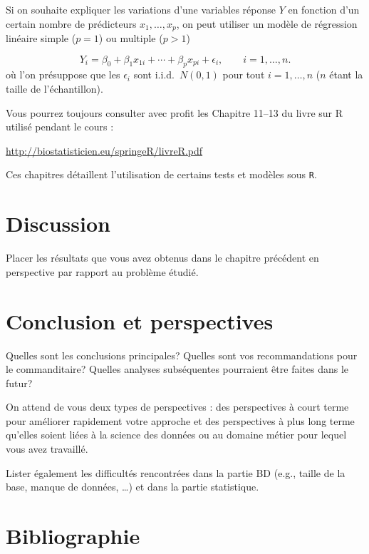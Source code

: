 \documentclass[mstat,12pt]{unswthesis}
\begin{document}
Si on souhaite expliquer les variations d'une variables réponse \(Y\) en
fonction d'un certain nombre de prédicteurs \(x_1,\ldots,x_p\), on peut
utiliser un modèle de régression linéaire simple (\(p=1\)) ou multiple
(\(p>1\))

\[
Y_i = \beta_0 + \beta_1 x_{1i} + \cdots +\beta_p x_{pi} + \epsilon_i, \qquad i=1,\ldots,n.
\] où l'on présuppose que les \(\epsilon_i\) sont i.i.d.~\(N(0,1)\) pour
tout \(i=1,\ldots,n\) (\(n\) étant la taille de l'échantillon).

Vous pourrez toujours consulter avec profit les Chapitre 11--13 du livre
sur R utilisé pendant le cours :

\url{http://biostatisticien.eu/springeR/livreR.pdf}

Ces chapitres détaillent l'utilisation de certains tests et modèles sous
\texttt{R}.

\chapter{Discussion}\label{discussion}

Placer les résultats que vous avez obtenus dans le chapitre précédent en
perspective par rapport au problème étudié.

\chapter{Conclusion et perspectives}\label{conclusion-et-perspectives}

Quelles sont les conclusions principales? Quelles sont vos
recommandations pour le commanditaire? Quelles analyses subséquentes
pourraient être faites dans le futur?

\bigskip

On attend de vous deux types de perspectives : des perspectives à court
terme pour améliorer rapidement votre approche et des perspectives à
plus long terme qu'elles soient liées à la science des données ou au
domaine métier pour lequel vous avez travaillé.

\bigskip

Lister également les difficultés rencontrées dans la partie BD (e.g.,
taille de la base, manque de données, \ldots) et dans la partie
statistique.

\chapter*{Bibliographie}\label{bibliographie}
\end{document}
